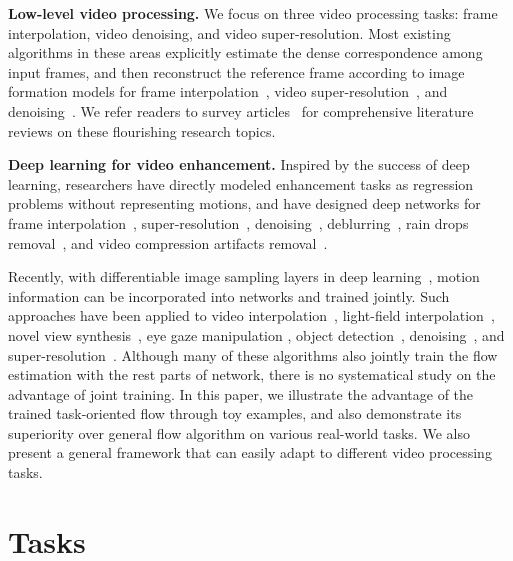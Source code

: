 \documentclass[twocolumn,natbib]{svjour3}          \smartqed  \usepackage{graphicx}
\newcommand{\myparagraph}[1]{\vspace{5pt}\noindent\textbf{#1}}
\begin{document}
\myparagraph{Low-level video processing.}
We focus on three video processing tasks: frame interpolation, video denoising, and video super-resolution.
Most existing algorithms in these areas explicitly estimate the dense correspondence among input frames, and then reconstruct the reference frame according to image formation models
for frame interpolation~\citep{baker2011database,werlberger2011optical,yu2013multi,jiang2018depth,sajjadi2018frame}, video super-resolution~\citep{liu2014bayesian,liao2015video}, and denoising~\citep{liu2010high,varghese2010video,maggioni2012video,mildenhall2018burst,godard2017deep}.
We refer readers to survey articles~\citep{nasrollahi2014super,ghoniem2010nonlocal} for comprehensive literature reviews on these flourishing research topics.

\myparagraph{Deep learning for video enhancement.}
Inspired by the success of deep learning, researchers have directly modeled enhancement tasks as regression problems without representing motions, and have designed deep networks for frame interpolation~\citep{Mathieu2016Deep,niklaus2017video,jiang2017super,niklaus2018context}, super-resolution~\citep{huang2015bidirectional,kappeler2016video,tao2017detail,bulat2018learn,ahn2018fast,jo2018deep}, denoising~\cite{mildenhall2018burst}, deblurring~\cite{yang2018multi,aittala2018burst}, rain drops removal~\citep{li2018video}, and video compression artifacts removal~\citep{lu2018deep}.

Recently, with differentiable image sampling layers in deep learning~\citep{Jaderberg2015Spatial}, motion information can be incorporated into networks and trained jointly. Such approaches have been applied to video interpolation~\citep{Liu2017Video}, light-field interpolation~\citep{wang2017light}, novel view synthesis~\citep{zhou2016view}, eye gaze manipulation \citep{Ganin2016DeepWarp:}, object detection~\citep{zhu2017flow}, denoising~\citep{wen2017joint}, and super-resolution~\citep{Caballero2017Real,tao2017detail,makansi2017end}. Although many of these algorithms also jointly train the flow estimation with the rest parts of network, there is no systematical study on the advantage of joint training. In this paper, we illustrate the advantage of the trained task-oriented flow through toy examples, and also demonstrate its superiority over general flow algorithm on various real-world tasks. We also present a general framework that can easily adapt to different video processing tasks. 
 \section{Tasks}
\label{sec:task}
\end{document}
